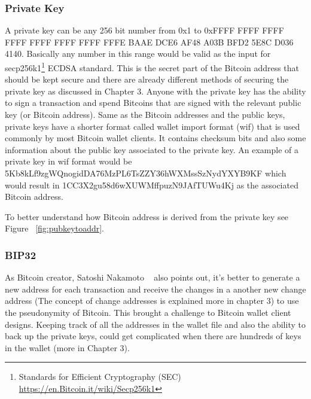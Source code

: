 \subsubsection{Private Key}
A private key can be any 256 bit number from 0x1 to 0xFFFF FFFF FFFF FFFF FFFF FFFF FFFF FFFE BAAE DCE6 AF48 A03B BFD2 5E8C D036 4140. Basically any number in this range would be valid as the input for secp256k1\footnote{Standards for Efficient Cryptography (SEC) \url{https://en.Bitcoin.it/wiki/Secp256k1}} ECDSA standard. This is the secret part of the Bitcoin address that should be kept secure and there are already different methods of securing the private key as discussed in Chapter 3. Anyone with the private key has the ability to sign a transaction and spend Bitcoins that are signed with the relevant public key (or Bitcoin address). 
Same as the Bitcoin addresses and the public keys, private keys have a shorter format called wallet import format (wif) that is used commonly by most Bitcoin wallet clients. It contains checksum bits and also some information about the public key associated to the private key. An example of a private key in wif format would be 5Kb8kLf9zgWQnogidDA76MzPL6TsZZY36hWXMssSzNydYXYB9KF which would result in 1CC3X2gu58d6wXUWMffpuzN9JAfTUWu4Kj as the associated Bitcoin address.

To better understand how Bitcoin address is derived from the private key see Figure  ~\ref{fig:pubkeytoaddr}.

\subsubsection{BIP32} \label{BIP32}
As Bitcoin creator, Satoshi Nakamoto ~\cite{Nak08} also points out, it's better to generate a new address for each transaction and receive the changes in a another new change address (The concept of change addresses is explained more in chapter 3) to use the pseudonymity of Bitcoin. This brought a challenge to Bitcoin wallet client designs. Keeping track of all the addresses in the wallet file and also the ability to back up the private keys, could get complicated when there are hundreds of keys in the wallet (more in Chapter 3). \\

